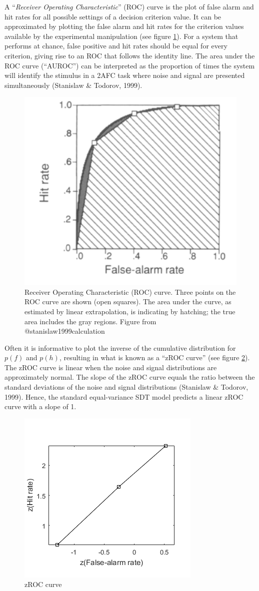\documentclass[12pt,twoside]{reedthesis}
\begin{document}
A ``\emph{Receiver Operating Characteristic}'' (ROC) curve is the plot of false alarm and hit rates for all possible settings of a decision criterion value. It can be approximated by plotting the false alarm and hit rates for the criterion values available by the experimental manipulation (see figure \ref{fig:app1-ROC}). For a system that performs at chance, false positive and hit rates should be equal for every criterion, giving rise to an ROC that follows the identity line. The area under the ROC curve (``AUROC'') can be interpreted as the proportion of times the system will identify the stimulus in a 2AFC task where noise and signal are presented simultaneously (Stanislaw \& Todorov, 1999).
\begin{figure}
\includegraphics[width=0.6\linewidth]{figure/app-SDT/ROC} \caption[Receiver Operative Characteristic (ROC) curve]{Receiver Operating Characteristic (ROC) curve. Three points on the ROC curve are shown (open squares). The area under the curve, as estimated by linear extrapolation, is indicating by hatching; the true area includes the gray regions. Figure from @stanislaw1999calculation}\label{fig:app1-ROC}
\end{figure}
Often it is informative to plot the inverse of the cumulative distribution for \(p(f)\) and \(p(h)\), resulting in what is known as a ``zROC curve'' (see figure \ref{fig:app1-zROC}). The zROC curve is linear when the noise and signal distributions are approximately normal. The slope of the zROC curve equals the ratio between the standard deviations of the noise and signal distributions (Stanislaw \& Todorov, 1999). Hence, the standard equal-variance SDT model predicts a linear zROC curve with a slope of 1.
\begin{figure}
\includegraphics[width=0.6\linewidth]{figure/app-SDT/zROC} \caption{zROC curve}\label{fig:app1-zROC}
\end{figure}
\end{document}
